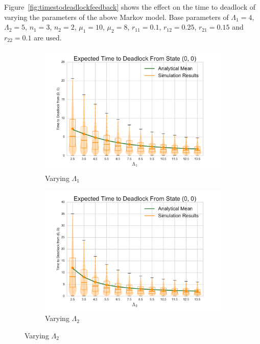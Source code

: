 \documentclass{article}
\numberwithin{equation}{section}
\begin{document}
Figure~\ref{fig:timestodeadlockfeedback} shows the effect on the time to deadlock of varying the parameters of the above Markov model.
Base parameters of $\Lambda_1 = 4$, $\Lambda_2 = 5$, $n_1 = 3$, $n_2 = 2$, $\mu_1 = 10$, $\mu_2 = 8$, $r_{11} = 0.1$, $r_{12} = 0.25$, $r_{21} = 0.15$ and $r_{22} = 0.1$ are used.


\begin{figure}[!htbp]
\begin{center}
\begin{subfigure}[b]{0.35\textwidth}
  \includegraphics[width=\textwidth]{images/vary_L1fb}
  \caption{Varying $\Lambda_1$}
  \label{fig:timestodeadlockfb_L1}
\end{subfigure}
\begin{subfigure}[b]{0.35\textwidth}
  \includegraphics[width=\textwidth]{images/vary_L2fb}
  \caption{Varying $\Lambda_2$}

\end{subfigure}
\end{center}
\end{figure}
\end{document}
